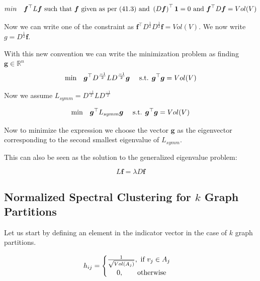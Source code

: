 \documentclass[english]{article}
\theoremstyle{plain}
\begin{document}
\begin{equation}
min\textnormal{\quad} \boldsymbol{f}^{\top}L\boldsymbol{f} \textnormal{ such that } \boldsymbol{f} \textnormal{ given as per (41.3) and } \left(D\boldsymbol{f}\right)^{\top}\boldsymbol{1}=0 \textnormal{ and }  \boldsymbol{f}^{\top}D\boldsymbol{f} = Vol(V)
\end{equation}

Now we can write one of the constraint as $\boldsymbol{f}^{\top}D^{\frac{1}{2}}D^{\frac{1}{2}}\boldsymbol{f} = Vol(V)$. We now write $g=D^{\frac{1}{2}}\boldsymbol{f}$.

With this new convention we can write the minimization problem as finding $\boldsymbol{g} \in \mathbb{R}^{n}$
\begin{equation}
\textnormal{min}\quad\boldsymbol{g}^{\top}D^{\frac{-1}{2}}LD^{\frac{-1}{2}}\boldsymbol{g} \quad   \textnormal{ s.t. }  \boldsymbol{g}^{\top}\boldsymbol{g} = Vol(V)
\end{equation}

Now we assume $L_{symm}= D^{\frac{-1}{2}}LD^{\frac{-1}{2}}$

\begin{equation}
\textnormal{min}\quad\boldsymbol{g}^{\top}L_{symm}\boldsymbol{g} \quad   \textnormal{ s.t. }  \boldsymbol{g}^{\top}\boldsymbol{g} = Vol(V)
\end{equation}

Now to minimize the expression we choose the vector $\boldsymbol{g}$ as the eigenvector corresponding to the second smallest eigenvalue of $L_{symm}$.

This can also be seen as the solution to the generalized eigenvalue problem:

\begin{equation}
L\boldsymbol{f} = \lambda D\boldsymbol{f}
\end{equation}

\subsection{Normalized Spectral Clustering for $k$ Graph Partitions}

Let us start by defining an element in the indicator vector in the case of $k$ graph partitions.

\begin{equation}
h_{ij} = \begin{cases}
\frac{1}{\sqrt{Vol(A_{j})}}, \textnormal{ if } v_{j} \in A_{j} \\
\textnormal{  \quad   }0, \textnormal{\qquad otherwise}\\
\end{cases}
\end{equation}
\end{document}

